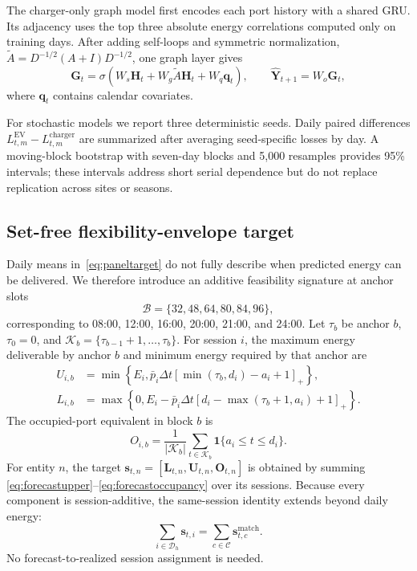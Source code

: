 \documentclass[11pt]{article}
\newcommand{\pos}[1]{\left[#1\right]_{+}}
\begin{document}
The charger-only graph model first encodes each port history with a shared GRU.
Its adjacency uses the top three absolute energy correlations computed only on
training days.  After adding self-loops and symmetric normalization,
\(\widetilde A=D^{-1/2}(A+I)D^{-1/2}\), one graph layer gives
\begin{equation}
 \mathbf G_t=
 \sigma(W_s\mathbf H_t+W_g\widetilde A\mathbf H_t+
 W_q\mathbf q_t),\qquad
 \widehat{\mathbf Y}_{t+1}=W_o\mathbf G_t,              \label{eq:graphforecast}
\end{equation}
where \(\mathbf q_t\) contains calendar covariates.

For stochastic models we report three deterministic seeds.  Daily paired
differences \(L^{\mathrm{EV}}_{t,m}-L^{\mathrm{charger}}_{t,m}\) are summarized
after averaging seed-specific losses by day.  A moving-block bootstrap with
seven-day blocks and 5,000 resamples provides 95\% intervals; these intervals
address short serial dependence but do not replace replication across sites
or seasons.

\subsection{Set-free flexibility-envelope target}
\label{sec:flexforecast}

Daily means in~\eqref{eq:paneltarget} do not fully describe when predicted
energy can be delivered.  We therefore introduce an additive feasibility
signature at anchor slots
\[
 \mathcal B=\{32,48,64,80,84,96\},
\]
corresponding to 08:00, 12:00, 16:00, 20:00, 21:00, and 24:00.  Let
\(\tau_b\) be anchor \(b\), \(\tau_0=0\), and
\(\mathcal K_b=\{\tau_{b-1}+1,\ldots,\tau_b\}\).  For session \(i\), the
maximum energy deliverable by anchor \(b\) and minimum energy required by that
anchor are
\begin{align}
 U_{i,b}
 &=\min\!\left\{
 E_i,\bar p_i\Delta t
 \pos{\min(\tau_b,d_i)-a_i+1}
 \right\},                                             \label{eq:forecastupper}\\
 L_{i,b}
 &=\max\!\left\{
 0,E_i-\bar p_i\Delta t
 \pos{d_i-\max(\tau_b+1,a_i)+1}
 \right\}.                                             \label{eq:forecastlower}
\end{align}
The occupied-port equivalent in block \(b\) is
\begin{equation}
 O_{i,b}=\frac{1}{|\mathcal K_b|}
 \sum_{t\in\mathcal K_b}\mathbf 1\{a_i\le t\le d_i\}.   \label{eq:forecastoccupancy}
\end{equation}
For entity \(n\), the target
\(\mathbf s_{t,n}=[\mathbf L_{t,n},\mathbf U_{t,n},
\mathbf O_{t,n}]\) is obtained by summing
\eqref{eq:forecastupper}--\eqref{eq:forecastoccupancy} over its sessions.
Because every component is session-additive, the same-session identity
extends beyond daily energy:
\begin{equation}
 \sum_{i\in\mathcal D_h}\mathbf s_{t,i}
 =
 \sum_{c\in\mathcal C}\mathbf s^{\mathrm{match}}_{t,c}.
                                                               \label{eq:signatureidentity}
\end{equation}
No forecast-to-realized session assignment is needed.
\end{document}
